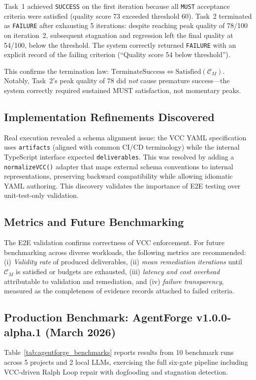 \documentclass[11pt]{article}
\begin{document}
Task~1 achieved \texttt{SUCCESS} on the first iteration because all \texttt{MUST} acceptance criteria were satisfied (quality score 73 exceeded threshold 60). Task~2 terminated as \texttt{FAILURE} after exhausting 5 iterations: despite reaching peak quality of 78/100 on iteration~2, subsequent stagnation and regression left the final quality at 54/100, below the threshold. The system correctly returned \texttt{FAILURE} with an explicit record of the failing criterion (``Quality score 54 below threshold'').

This confirms the termination law: $\mathrm{TerminateSuccess} \iff \mathrm{Satisfied}(\mathcal{C}_M)$. Notably, Task~2's peak quality of 78 did \emph{not} cause premature success---the system correctly required sustained MUST satisfaction, not momentary peaks.

\subsection{Implementation Refinements Discovered}
Real execution revealed a schema alignment issue: the VCC YAML specification uses \texttt{artifacts} (aligned with common CI/CD terminology) while the internal TypeScript interface expected \texttt{deliverables}. This was resolved by adding a \texttt{normalizeVCC()} adapter that maps external schema conventions to internal representations, preserving backward compatibility while allowing idiomatic YAML authoring. This discovery validates the importance of E2E testing over unit-test-only validation.

\subsection{Metrics and Future Benchmarking}
The E2E validation confirms correctness of VCC enforcement. For future benchmarking across diverse workloads, the following metrics are recommended:
(i) \emph{Validity rate} of produced deliverables, (ii) \emph{mean remediation iterations} until $\mathcal{C}_M$ is satisfied or budgets are exhausted,
(iii) \emph{latency and cost overhead} attributable to validation and remediation, and
(iv) \emph{failure transparency}, measured as the completeness of evidence records attached to failed criteria.



\subsection{Production Benchmark: AgentForge v1.0.0-alpha.1 (March 2026)}
Table~\ref{tab:agentforge_benchmarks} reports results from 10 benchmark runs across 5 projects and 2 local LLMs, exercising the full six-gate pipeline including VCC-driven Ralph Loop repair with dogfooding and stagnation detection.
\end{document}
